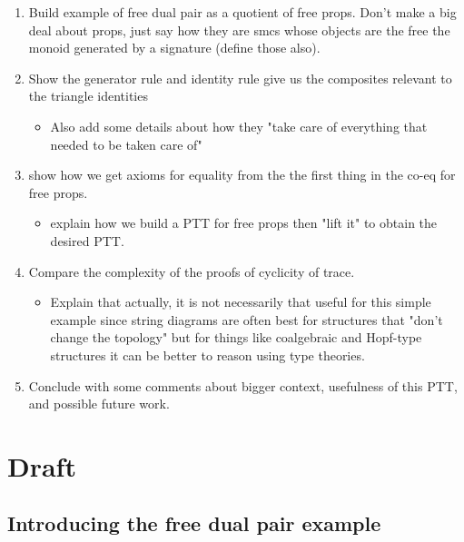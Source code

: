 \documentclass[pra,floatfix,
amsmath,superscriptaddress, 12pt]{article}
\theoremstyle{definition}
\begin{document}
\begin{enumerate}
\item Build example of free dual pair as a quotient of free props. Don't make a big deal about props, just say how they are smcs whose objects are the free the monoid generated by a signature (define those also).

\item Show the generator rule and identity rule give us the composites relevant to the triangle identities
	\begin{itemize}
		\item Also add some details about how they "take care of everything that needed to be taken care of"
	\end{itemize}

\item show how we get axioms for equality from the the first thing in the co-eq for free props.
\begin{itemize}
	\item explain how we build a PTT for free props then "lift it" to obtain the desired PTT.
\end{itemize}

\item Compare the complexity of the proofs of cyclicity of trace.
	\begin{itemize}
		\item Explain that actually, it is not necessarily that useful for this simple example since string diagrams are often best for structures that "don't change the topology" but for things like coalgebraic and Hopf-type structures it can be better to reason using type theories.
	\end{itemize}

\item Conclude with some comments about bigger context, usefulness of this PTT, and possible future work.

\end{enumerate}






\newpage



\section{Draft}

\subsection{Introducing the free dual pair example}
\end{document}
